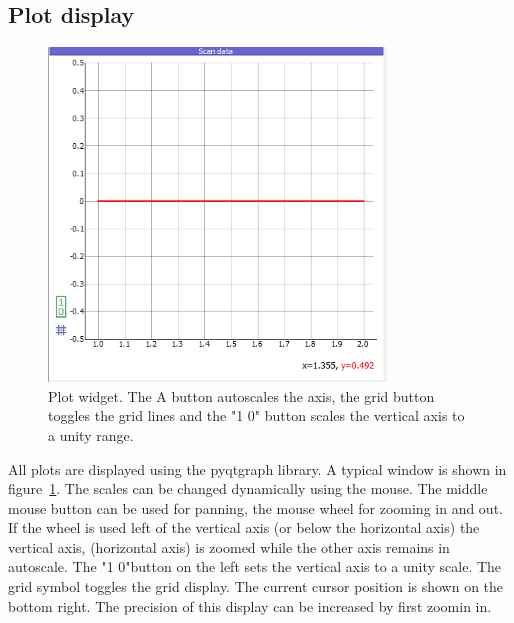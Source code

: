\documentclass[11pt]{scrartcl}
\begin{document}
\subsection{Plot display}
\begin{figure}[htbp]
\begin{center}
\includegraphics[width=0.8\textwidth]{ScanData}
\end{center}
\caption{\label{ScanData} Plot widget. The A button autoscales the axis, the grid button toggles the grid lines and the "1 0" button scales the vertical axis to a unity range.}
\end{figure}
All plots are displayed using the pyqtgraph library. A typical window is shown in figure~\ref{ScanData}. The scales can be changed dynamically using the mouse. The middle mouse button can be used for panning, the mouse wheel for zooming in and out. If the wheel is used left of the vertical axis (or below the horizontal axis) the vertical axis, (horizontal axis) is zoomed while the other axis remains in autoscale. The "1 0"button on the left sets the vertical axis to a unity scale. The grid symbol toggles the grid display. The current cursor position is shown on the bottom right. The precision of this display can be increased by first zoomin in.
\end{document}
